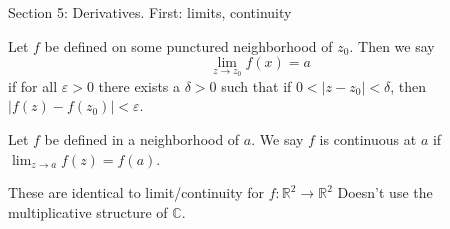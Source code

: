 \documentclass{beamer}
\newcommand{\C}{\mathbb{C}}
\newcommand{\R}{\mathbb{R}}
\begin{document}
   \begin{frame}[plain]
     \end{frame}




\begin{frame}{Section 5: Derivatives.  First: limits, continuity}

\begin{definition}[Limits]Let $f$ be defined on some punctured neighborhood of $z_0$.
Then we say
$$\lim_{z\to z_0} f(x)=a$$
if for all $\varepsilon>0$ there exists a $\delta>0$ such that if $0<|z-z_0|<\delta$, then $|f(z)-f(z_0)|<\varepsilon$.
\end{definition}

\begin{definition}[Continuous]Let $f$ be defined in a neighborhood of $a$.  We say $f$ is continuous at $a$ if $\lim_{z\to a}f(z)=f(a)$.
\end{definition}



\begin{block}{These are identical to limit/continuity for $f:\R^2\to\R^2$}
Doesn't use the multiplicative structure of $\C$.
\end{block}
\end{frame}
\end{document}

